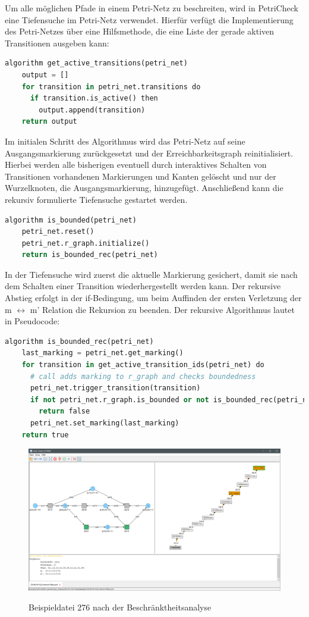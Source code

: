 Um alle möglichen Pfade in einem Petri-Netz zu beschreiten, wird in PetriCheck
eine Tiefensuche im Petri-Netz verwendet. Hierfür verfügt die Implementierung
des Petri-Netzes über eine Hilfsmethode, die eine Liste der gerade aktiven
Transitionen ausgeben kann:

\begin{lstlisting}[language=python, morekeywords={do, algorithm, then}]
  algorithm get_active_transitions(petri_net)
    output = []
    for transition in petri_net.transitions do
      if transition.is_active() then
        output.append(transition)
    return output
\end{lstlisting}

Im initialen Schritt des Algorithmus wird das Petri-Netz auf seine
Ausgangsmarkierung zurückgesetzt und der Erreichbarkeitsgraph reinitialisiert.
Hierbei werden alle bisherigen eventuell durch interaktives Schalten von
Transitionen vorhandenen Markierungen und Kanten gelöscht und nur der
Wurzelknoten, die Ausgangsmarkierung, hinzugefügt. Anschließend kann die rekursiv
formulierte Tiefensuche gestartet werden.

\begin{lstlisting}[language=python, morekeywords={do, algorithm, then}]
  algorithm is_bounded(petri_net)
    petri_net.reset()
    petri_net.r_graph.initialize()
    return is_bounded_rec(petri_net)
\end{lstlisting}

In der Tiefensuche wird zuerst die aktuelle Markierung gesichert, damit sie nach
dem Schalten einer Transition wiederhergestellt werden kann. Der rekursive
Abstieg erfolgt in der if-Bedingung, um beim Auffinden der ersten Verletzung der
m $\leftrightarrow$ m' Relation die Rekursion zu beenden. Der rekursive
Algorithmus lautet in Pseudocode:

\begin{lstlisting}[language=python, morekeywords={do, algorithm, then}]
  algorithm is_bounded_rec(petri_net)
    last_marking = petri_net.get_marking()
    for transition in get_active_transition_ids(petri_net) do
      # call adds marking to r_graph and checks boundedness
      petri_net.trigger_transition(transition)
      if not petri_net.r_graph.is_bounded or not is_bounded_rec(petri_net) then
        return false
      petri_net.set_marking(last_marking)
    return true
\end{lstlisting}

\begin{figure}[ht]
  \includegraphics[width=\textwidth]{../img/Screenshot_276_default_layout.png}
  \label{img:ex276_default}
  \caption{Beispieldatei 276 nach der Beschränktheitsanalyse}
\end{figure}
